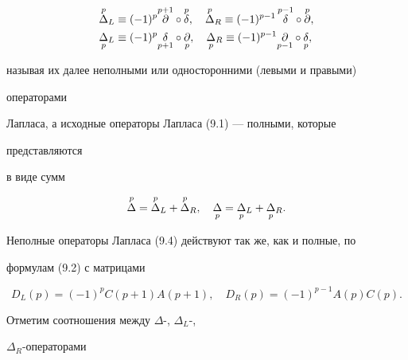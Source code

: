 \begin{equation} 


\begin{split} 


\up{p}{\Delta}_L&\equiv(-1)^p\up{p+1}{\partial}\circ 


\up{p}{\delta},\quad 


\up{p}{\Delta}_R\equiv(-1)^{p-1}\,\up{p-1}{\delta} 


\circ\up{p}{\partial},\\ 


\down{p}{\Delta}_L&\equiv(-1)^p\down{p+1}{\delta} 


\circ\down{p}{\partial},\quad 


\down{p}{\Delta}_R\equiv(-1)^{p-1} 


\down{p-1}{\partial}\circ\down{p}{\delta}, 


\end{split} 


\end{equation} 


называя их далее неполными или односторонними (левыми и правыми) 


операторами  


Лапласа, а исходные операторы Лапласа (9.1) --- полными, которые 


представляются 


в виде сумм 


\begin{equation} 


\up{p}{\Delta}=\up{p}{\Delta}_L+\up{p}{\Delta}_R,\quad 


\down{p}{\Delta}=\down{p}{\Delta}_L+\down{p}{\Delta}_R. 


\end{equation} 


Неполные операторы Лапласа (9.4) действуют так же, как и полные, по 


формулам (9.2) с матрицами 


\begin{equation} 


D_L(p)=(-1)^p C(p+1)A(p+1),\quad 


D_R(p)=(-1)^{p-1}A(p)C(p). 


\end{equation} 


 


Отметим соотношения между $\Delta$-, $\Delta_L$-,


$\Delta_R$-операторами 


